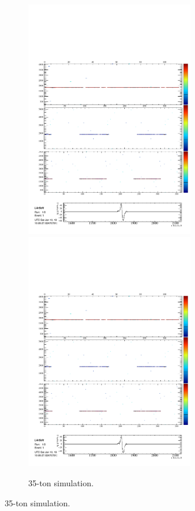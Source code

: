 \begin{figure}
\begin{subfigure}[t]{\linewidth}
\begin{minipage}{0.48\textwidth}
      \includegraphics[width=0.8\textwidth]{SimulatedMuonU1.pdf}
      \includegraphics[width=0.8\textwidth]{SimulatedMuonU2.pdf}
    \end{minipage}
    \caption{35-ton simulation.}
    \label{fig:SimulationMuon}
  \end{subfigure}


\end{figure}
